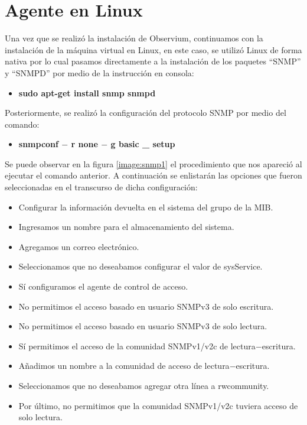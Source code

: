 \section{Agente en Linux}
Una vez que se realizó la instalación de Observium, continuamos con la instalación de la máquina virtual en Linux, en este caso, se utilizó Linux de forma nativa por lo cual pasamos directamente a la instalación de los paquetes ``SNMP'' y ``SNMPD'' por medio de la instrucción en consola:
\begin{itemize}
\item \textbf{sudo apt-get install snmp snmpd}
\end{itemize}
Posteriormente, se realizó la configuración del protocolo SNMP por medio del comando:
\begin{itemize}
\item \textbf{snmpconf $-$ r none $-$ g basic \_ setup}
\end{itemize}
Se puede observar en la figura \ref{image:snmp1} el procedimiento que nos apareció al ejecutar el comando anterior. A continuación se enlistarán las opciones que fueron seleccionadas en el transcurso de dicha configuración:
\begin{itemize}
\item Configurar la información devuelta en el sistema del grupo de la MIB.
\item Ingresamos un nombre para el almacenamiento del sistema.
\item Agregamos un correo electrónico.
\item Seleccionamos que no deseabamos configurar el valor de sysService.
\item Sí configuramos el agente de control de acceso.
\item No permitimos el acceso basado en usuario SNMPv3 de solo escritura.
\item No permitimos el acceso basado en usuario SNMPv3 de solo lectura.
\item Sí permitimos el acceso de la comunidad SNMPv1/v2c de lectura$-$escritura.
\item Añadimos un nombre a la comunidad de acceso de lectura$-$escritura.
\item Seleccionamos que no deseabamos agregar otra línea a rwcommunity.
\item Por último, no permitimos que la comunidad SNMPv1/v2c tuviera acceso de solo lectura.
\end{itemize}
\FloatBarrier
